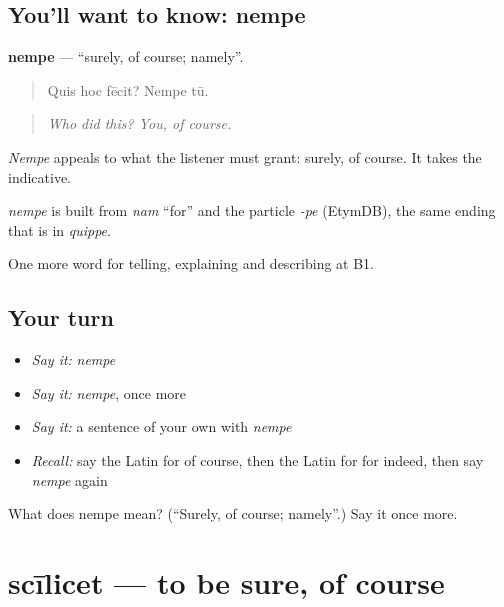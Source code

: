 \subsection*{You'll want to know: nempe}
\textbf{nempe} — \textquotedblleft{}surely, of course; namely\textquotedblright{}.

\begin{quote}
Quis hoc fēcit? Nempe tū.
\end{quote}

\begin{quote}
\emph{Who did this? You, of course.}
\end{quote}

\emph{Nempe} appeals to what the listener must grant: surely, of course. It takes the indicative.

\begin{cousinweb}
\emph{nempe} is built from \emph{nam} \textquotedblleft{}for\textquotedblright{} and the particle \emph{-pe} (EtymDB), the same ending that is in \emph{quippe}.
\end{cousinweb}

\begin{grammarlens}[title={What you've built}]
One more word for telling, explaining and describing at B1.
\end{grammarlens}

\subsection*{Your turn}
\begin{itemize}
\raggedright
  \item \emph{Say it:} \emph{nempe}
  \item \emph{Say it:} \emph{nempe}, once more
  \item \emph{Say it:} a sentence of your own with \emph{nempe}
  \item \emph{Recall:} say the Latin for of course, then the Latin for for indeed, then say \emph{nempe} again
\end{itemize}

\begin{tcolorbox}[breakable,colback=teal!4,colframe=teal!35!black,title={Before you move on}]
What does nempe mean? (\textquotedblleft{}Surely, of course; namely\textquotedblright{}.) Say it once more.
\end{tcolorbox}
\section[scīlicet]{scīlicet — to be sure, of course}

